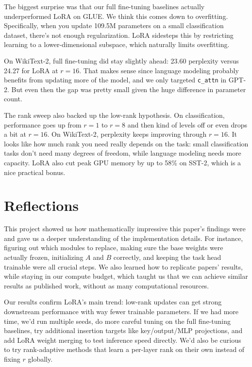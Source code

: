\documentclass[11pt,twocolumn]{article}
\begin{document}
The biggest surprise was that our full fine-tuning baselines actually underperformed LoRA on GLUE. We think this comes down to overfitting. Specifically, when you update 109.5M parameters on a small classification dataset, there's not enough regularization. LoRA sidesteps this by restricting learning to a lower-dimensional subspace, which naturally limits overfitting.

On WikiText-2, full fine-tuning did stay slightly ahead: 23.60 perplexity versus 24.27 for LoRA at $r=16$. That makes sense since language modeling probably benefits from updating more of the model, and we only targeted \texttt{c\_attn} in GPT-2. But even then the gap was pretty small given the huge difference in parameter count.

The rank sweep also backed up the low-rank hypothesis. On classification, performance goes up from $r=1$ to $r=8$ and then kind of levels off or even drops a bit at $r=16$. On WikiText-2, perplexity keeps improving through $r=16$. It looks like how much rank you need really depends on the task: small classification tasks don't need many degrees of freedom, while language modeling needs more capacity. LoRA also cut peak GPU memory by up to 58\% on SST-2, which is a nice practical bonus.

\section{Reflections}
This project showed us how mathematically impressive this paper's findings were and gave us a deeper understanding of the implementation details. For instance, figuring out which modules to replace, making sure the base weights were actually frozen, initializing $A$ and $B$ correctly, and keeping the task head trainable were all crucial steps. We also learned how to replicate papers' results, while staying in our compute budget, which taught us that we can achieve similar results as published work, without as many computational resources.

Our results confirm LoRA's main trend: low-rank updates can get strong downstream performance with way fewer trainable parameters. If we had more time, we'd run multiple seeds, do more careful tuning on the full fine-tuning baselines, try additional insertion targets like key/output/MLP projections, and add LoRA weight merging to test inference speed directly. We'd also be curious to try rank-adaptive methods that learn a per-layer rank on their own instead of fixing $r$ globally.
\end{document}
